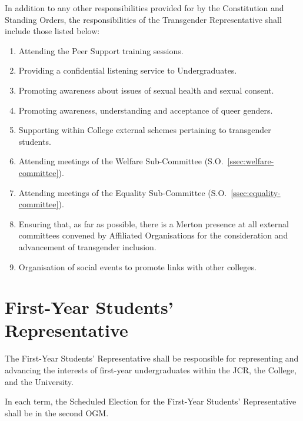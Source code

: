 \npara In addition to any other responsibilities provided for by the Constitution and Standing Orders, the responsibilities of the Transgender Representative shall include those listed below:
\begin{enumerate}
	\item Attending the Peer Support training sessions.
	\item Providing a confidential listening service to Undergraduates.
	\item Promoting awareness about issues of sexual health and sexual consent. 
	\item Promoting awareness, understanding and acceptance of queer genders. 
	\item Supporting within College external schemes pertaining to transgender students. 
	\item Attending meetings of the Welfare Sub-Committee (S.O.~\ref{ssec:welfare-committee}). 
	\item Attending meetings of the Equality Sub-Committee (S.O.~\ref{ssec:equality-committee}). 
	\item Ensuring that, as far as possible, there is a Merton presence at all external committees convened by Affiliated Organisations for the consideration and advancement of transgender inclusion. 
	\item Organisation of social events to promote links with other colleges.
\end{enumerate}

\section{First-Year Students' Representative}
\npara The First-Year Students’ Representative shall be responsible for representing and advancing the interests of first-year undergraduates within the JCR, the College, and the University.

\npara  In each term, the Scheduled Election for the First-Year Students’ Representative shall be in the second OGM.

